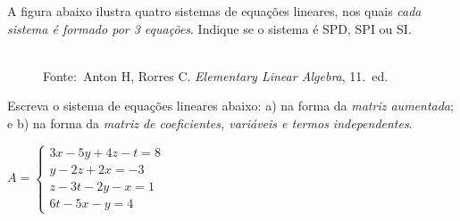 \documentclass[pdftex, brazil, 12pt, oneside, addpoints]{exam}
\newcommand{\vf}[1][{}]{%
  \fillin[#1][0.25in]%
}
\begin{document}
\begin{questions}
\question
A figura abaixo ilustra quatro sistemas de
equações lineares, nos quais \emph{cada sistema é formado por 3
equações}. Indique se o sistema é SPD, SPI ou SI.
\begin{figure}[H]
  \begin{center}
    \\
    \footnotesize{Fonte:~Anton H, Rorres C. \emph{Elementary Linear Algebra}, 11.\ ed.}
  \end{center}
\end{figure}
\vspace{-0.5cm}

\question
Escreva o sistema de equações lineares abaixo: a) na forma da \emph{matriz
aumentada}; e b) na forma da \emph{matriz de coeficientes, variáveis e
termos independentes}.
\begin{center}$A = \begin{cases}
     3x - 5y + 4z - t = 8\\
      y - 2z + 2x     = -3\\
      z - 3t - 2y - x = 1\\
     6t - 5x -  y     = 4 
  \end{cases}$
\end{center}






\end{questions}
\end{document}
